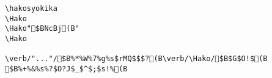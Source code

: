 \begin{verbatim}
\hakosyokika
\Hako
\Hako"$BNcBj(B"
\Hako

\verb/"..."/$B%*%W%7%g%s$rMQ$$$?(B\verb/\Hako/$B$G$O!$(B
$B%+%&%s%?$O?J$_$^$;$s!%(B
\end{verbatim}
